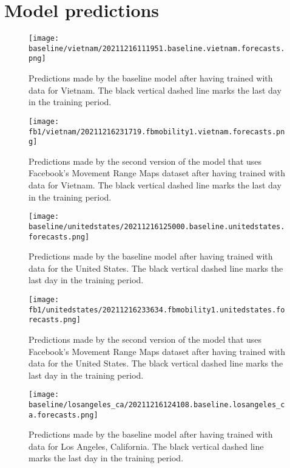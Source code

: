 \appendix

\chapter{Model predictions}


\begin{figure}[!htb]
    \centering
    \texttt{[image: baseline/vietnam/20211216111951.baseline.vietnam.forecasts.png]}
    \caption{Predictions made by the baseline model after having trained with data for Vietnam. The black vertical dashed line marks the last day in the training period.}
    \label{fig:predictions-vietnam-baseline}
\end{figure}

\begin{figure}[!htb]
    \centering
    \texttt{[image: fb1/vietnam/20211216231719.fbmobility1.vietnam.forecasts.png]}
    \caption{Predictions made by the second version of the model that uses Facebook's Movement Range Maps dataset after having trained with data for Vietnam. The black vertical dashed line marks the last day in the training period.}
    \label{fig:predictions-vietnam-fb1}
\end{figure}


\begin{figure}[!htb]
    \centering
    \texttt{[image: baseline/unitedstates/20211216125000.baseline.unitedstates.forecasts.png]}
    \caption{Predictions made by the baseline model after having trained with data for the United States. The black vertical dashed line marks the last day in the training period.}
    \label{fig:predictions-usa-baseline}
\end{figure}

\begin{figure}[!htb]
    \centering
    \texttt{[image: fb1/unitedstates/20211216233634.fbmobility1.unitedstates.forecasts.png]}
    \caption{Predictions made by the second version of the model that uses Facebook's Movement Range Maps dataset after having trained with data for the United States. The black vertical dashed line marks the last day in the training period.}
    \label{fig:predictions-usa-fb1}
\end{figure}


\begin{figure}[!htb]
    \centering
    \texttt{[image: baseline/losangeles\_ca/20211216124108.baseline.losangeles\_ca.forecasts.png]}
    \caption{Predictions made by the baseline model after having trained with data for Los Angeles, California. The black vertical dashed line marks the last day in the training period.}
    \label{fig:predictions-losangeles-baseline}
\end{figure}

